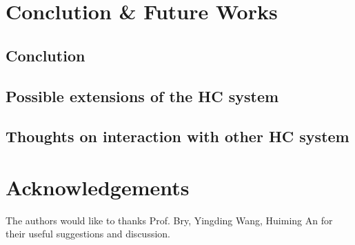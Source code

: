 \section{Conclution \& Future Works}

\subsection{Conclution}

\subsection{Possible extensions of the HC system}

\subsection{Thoughts on interaction with other HC system}

\section{Acknowledgements}

The authors would like to thanks Prof. Bry, Yingding Wang, Huiming An for their useful suggestions and discussion.
